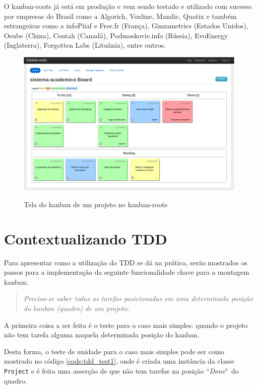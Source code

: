 O kanban-roots já está em produção e vem sendo testado e utilizado com sucesso por empresas do Brasil como a Algorich, Voxline, Mandic, Quatix e também estrangeiras como a infoPiiaf e Free.fr (França), Ginzametrics (Estados Unidos), Osube (China), Centah (Canadá), Podmoskovie.info (Rússia), EvoEnergy (Inglaterra), Forgotten Labs (Lituânia), entre outros.

\begin{landscape}
  \begin{figure}[h]
    \center
    \caption{Tela do kanban de um projeto no kanban-roots}
    \includegraphics[scale=0.5]{images/kanban-roots}
    \label{img:tela_kaban_roots}
  \end{figure}
\end{landscape}

\section{Contextualizando TDD}
\label{sec:contextualizando_tdd}

Para apresentar como a utilização do TDD se dá na prática, serão mostrados os passos para a implementação da seguinte funcionalidade chave para a montagem kanban:

\begin{quote}
\textit{Precisa-se saber todas as tarefas posicionadas em uma determinada posição do kanban (quadro) de um projeto.}
\end{quote}

A primeira coisa a ser feita é o teste para o caso mais simples: quando o projeto não tem tarefa alguma naquela determinada posição do kanban.

Desta forma, o teste de unidade para o caso mais simples pode ser como mostrado no código \ref{code:tdd_test1}, onde é criada uma instância da classe \texttt{Project} e é feita uma asserção de que não tem tarefas na posição ``\textit{Done}"\ do quadro.

